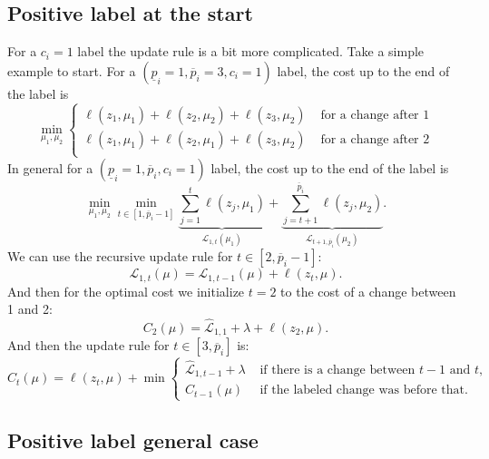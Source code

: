 \documentclass{article}
\begin{document}
\subsection{Positive label at the start}
For a $c_i=1$ label the update rule is a bit more complicated. Take a
simple example to start. For a
$(\underline p_i=1,\overline p_i=3,c_i=1)$ label, the cost up to the
end of the label is
\begin{equation}
  \label{eq:positive_cost}
  \min_{\mu_1, \mu_2}
  \begin{cases}
    \ell(z_1,\mu_1) + \ell(z_2, \mu_2)+\ell(z_3, \mu_2) &\text{ for a
      change after 1}\\
    \ell(z_1,\mu_1) + \ell(z_2, \mu_1)+\ell(z_3, \mu_2) &\text{ for a
      change after 2}\\
  \end{cases}
\end{equation}
In general for a
$(\underline p_i=1,\overline p_i,c_i=1)$ label, the cost up to the end
of the label is
\begin{equation}
  \label{eq:positive_cost}
  \min_{\mu_1, \mu_2}
  \min_{t\in[1, \overline p_i-1]}
  \underbrace{
    \sum_{j=1}^t \ell(z_j, \mu_1)
  }_{\mathcal L_{1,t}(\mu_1)}+
  \underbrace{
    \sum_{j=t+1}^{\overline p_i}\ell(z_j, \mu_2)
  }_{\mathcal L_{t+1,\overline p_i}(\mu_2)}.
\end{equation}
We can use the recursive update rule for $t\in[2,\overline p_i-1]$:
\begin{equation}
  \mathcal L_{1,t}(\mu) = \mathcal L_{1,t-1}(\mu) +\ell(z_t , \mu).
\end{equation}
And then for the optimal cost we initialize $t=2$ to the cost of a
change between 1 and 2:
\begin{equation}
  C_2(\mu)=\mathcal{\hat L}_{1,1}+\lambda+\ell(z_2,\mu).
\end{equation}
And then
the update rule for
$t\in[3, \overline p_i]$ is:
\begin{equation}
  \label{eq:positive_update}
  C_t(\mu)=\ell(z_t, \mu) + \min
  \begin{cases}
\mathcal{\hat L}_{1, t-1}+\lambda &\text{ if there is a change between $t-1$ and $t$,}\\
C_{t-1}(\mu) & \text{ if the labeled change was before that.}
  \end{cases}
\end{equation}
\subsection{Positive label general case}
\end{document}
